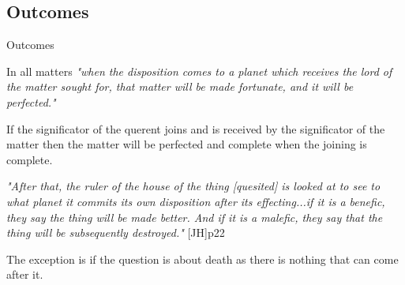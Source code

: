 \subsection{Outcomes}
\begin{frame}[t]{Outcomes}
\begin{block}{}
In all matters \textsl{"when the disposition comes to a planet which receives the lord of the matter sought for, that matter will be made fortunate, and it will be perfected."}
\end{block}

If the significator of the querent joins and is received by the significator of the matter then the matter will be perfected and complete when the joining is complete. 

\begin{block}{}
\textsl{"After that, the ruler of the house of the thing [quesited] is looked at to see to what planet it commits its own disposition after its effecting...if it is a benefic, they say the thing will be made better. And if it is a malefic, they say that the thing will be subsequently destroyed."} [JH]p22
\end{block}

The exception is if the question is about death as there is nothing that can come after it.

\end{frame}
